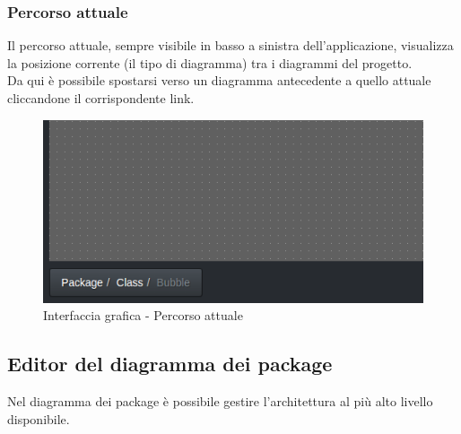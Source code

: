 \documentclass[../ManualeUtente.tex]{subfiles}
\begin{document}
			\subsubsection{Percorso attuale}
				Il percorso attuale, sempre visibile in basso a sinistra dell'applicazione, visualizza la
				posizione corrente (il tipo di diagramma) tra i diagrammi del progetto.\\
				Da qui è possibile spostarsi verso un diagramma
				antecedente a quello attuale cliccandone il corrispondente link.
				\begin{figure} [h!]
					\centering
					\includegraphics[scale=0.4]{./Immagini/Path.png}
					\caption{Interfaccia grafica - Percorso attuale}\label{fig:Path}
				\end{figure}
		\newpage
		\subsection{Editor del diagramma dei package}
			Nel diagramma dei package è possibile gestire l'architettura al più alto livello disponibile.
\end{document}
